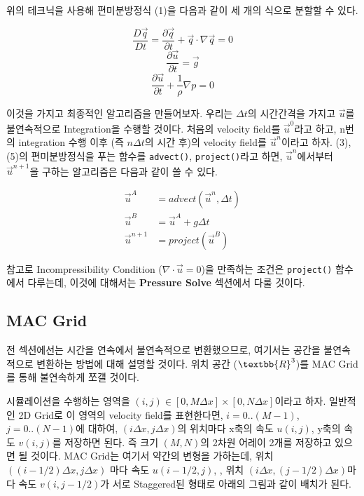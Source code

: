 \documentclass[10pt, A4]{article}
\begin{document}
위의 테크닉을 사용해 편미분방정식 (1)을 다음과 같이 세 개의 식으로 분할할 수 있다.

\begin{equation}
  \frac{D\vec{q}}{Dt} = \frac{\partial \vec{q}}{\partial t} + \vec{q} \cdot \nabla \vec{q} = 0
\end{equation}
\begin{equation}
  \frac{\partial \vec{u}}{\partial t} = \vec{g}
\end{equation}
\begin{equation}
  \frac{\partial \vec{u}}{\partial t} + \frac{1}{\rho} \nabla p = 0
\end{equation}

이것을 가지고 최종적인 알고리즘을 만들어보자.
우리는 $\Delta t$의 시간간격을 가지고 $\vec{u}$를 불연속적으로 Integration을 수행할 것이다. 처음의 velocity field를 $\vec{u}^0$라고 하고, n번의 integration 수행 이후 (즉 $n \Delta t$의 시간 후)의 velocity field를 $\vec{u}^n$이라고 하자. (3), (5)의 편미분방정식을 푸는 함수를 \texttt{advect()}, \texttt{project()}라고 하면, $\vec{u}^n$에서부터 $\vec{u}^{n+1}$을 구하는 알고리즘은 다음과 같이 쓸 수 있다.

\begin{align}
  \vec{u}^A &= advect(\vec{u}^n, \Delta t) \\
  \vec{u}^B &= \vec{u}^A + g \Delta t \\
  \vec{u}^{n+1} &= project(\vec{u}^B)
\end{align}

참고로 Incompressibility Condition ($\nabla \cdot \vec{u} = 0$)을 만족하는 조건은 \texttt{project()} 함수에서 다루는데, 이것에 대해서는 \textbf{Pressure Solve} 섹션에서 다룰 것이다.

\subsection{MAC Grid}

전 섹션에선는 시간을 연속에서 불연속적으로 변환했으므로, 여기서는 공간을 불연속적으로 변환하는 방법에 대해 설명할 것이다. 위치 공간 ($\textbb{R}^3$)를 MAC Grid를 통해 불연속하게 쪼갤 것이다.

시뮬레이션을 수행하는 영역을 $(i, j) \in [0, M \Delta x] \times [0, N \Delta x]$이라고 하자. 일반적인 2D Grid로 이 영역의 velocity field를 표현한다면, $i = 0..(M-1)$, $j = 0..(N-1)$에 대하여,  $(i \Delta x, j \Delta x)$의 위치마다 x축의 속도 $u(i, j)$, y축의 속도 $v(i, j)$를 저장하면 된다. 즉 크기 $(M, N)$의 2차원 어레이 2개를 저장하고 있으면 될 것이다. MAC Grid는 여기서 약간의 변형을 가하는데, 위치 $((i-1/2) \Delta x, j \Delta x)$ 마다 속도 $u(i-1/2, j)$, , 위치 $(i \Delta x, (j-1/2) \Delta x)$마다 속도 $v(i,j-1/2)$가 서로 Staggered된 형태로 아래의 그림과 같이 배치가 된다.
\end{document}
